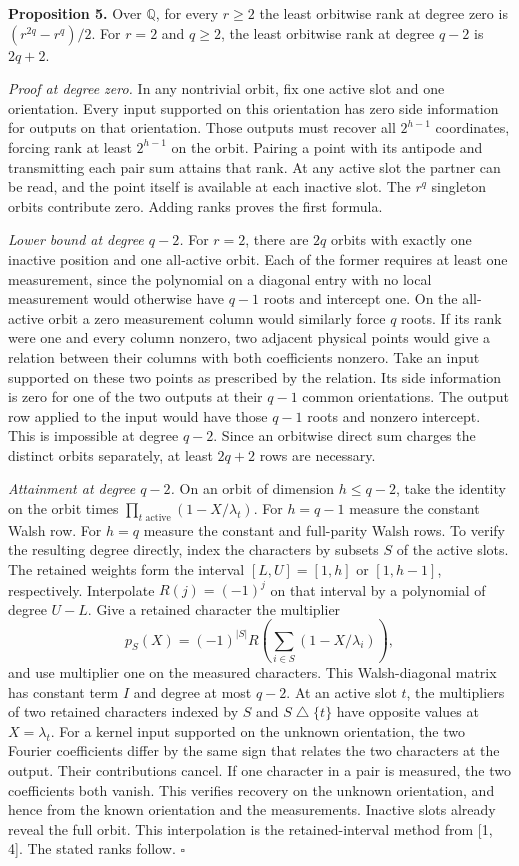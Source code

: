 \documentclass[
  10pt,
]{article}
\begin{document}
\textbf{Proposition 5.} Over \(\mathbb Q\), for every \(r\ge2\) the
least orbitwise rank at degree zero is \((r^{2q}-r^q)/2\). For \(r=2\)
and \(q\ge2\), the least orbitwise rank at degree \(q-2\) is \(2q+2\).

\emph{Proof at degree zero.} In any nontrivial orbit, fix one active
slot and one orientation. Every input supported on this orientation has
zero side information for outputs on that orientation. Those outputs
must recover all \(2^{h-1}\) coordinates, forcing rank at least
\(2^{h-1}\) on the orbit. Pairing a point with its antipode and
transmitting each pair sum attains that rank. At any active slot the
partner can be read, and the point itself is available at each inactive
slot. The \(r^q\) singleton orbits contribute zero. Adding ranks proves
the first formula.

\emph{Lower bound at degree \(q-2\).} For \(r=2\), there are \(2q\)
orbits with exactly one inactive position and one all-active orbit. Each
of the former requires at least one measurement, since the polynomial on
a diagonal entry with no local measurement would otherwise have \(q-1\)
roots and intercept one. On the all-active orbit a zero measurement
column would similarly force \(q\) roots. If its rank were one and every
column nonzero, two adjacent physical points would give a relation
between their columns with both coefficients nonzero. Take an input
supported on these two points as prescribed by the relation. Its side
information is zero for one of the two outputs at their \(q-1\) common
orientations. The output row applied to the input would have those
\(q-1\) roots and nonzero intercept. This is impossible at degree
\(q-2\). Since an orbitwise direct sum charges the distinct orbits
separately, at least \(2q+2\) rows are necessary.

\emph{Attainment at degree \(q-2\).} On an orbit of dimension
\(h\le q-2\), take the identity on the orbit times
\(\prod_{t\text{ active}}(1-X/\lambda_t)\). For \(h=q-1\) measure the
constant Walsh row. For \(h=q\) measure the constant and full-parity
Walsh rows. To verify the resulting degree directly, index the
characters by subsets \(S\) of the active slots. The retained weights
form the interval \([L,U]=[1,h]\) or \([1,h-1]\), respectively.
Interpolate \(R(j)=(-1)^j\) on that interval by a polynomial of degree
\(U-L\). Give a retained character the multiplier \[
        p_S(X)=(-1)^{|S|}
          R\left(\sum_{i\in S}(1-X/\lambda_i)\right),
\] and use multiplier one on the measured characters. This
Walsh-diagonal matrix has constant term \(I\) and degree at most
\(q-2\). At an active slot \(t\), the multipliers of two retained
characters indexed by \(S\) and \(S\mathbin{\triangle}\{t\}\) have
opposite values at \(X=\lambda_t\). For a kernel input supported on the
unknown orientation, the two Fourier coefficients differ by the same
sign that relates the two characters at the output. Their contributions
cancel. If one character in a pair is measured, the two coefficients
both vanish. This verifies recovery on the unknown orientation, and
hence from the known orientation and the measurements. Inactive slots
already reveal the full orbit. This interpolation is the
retained-interval method from {[}1, 4{]}. The stated ranks follow.
\(\square\)
\end{document}
